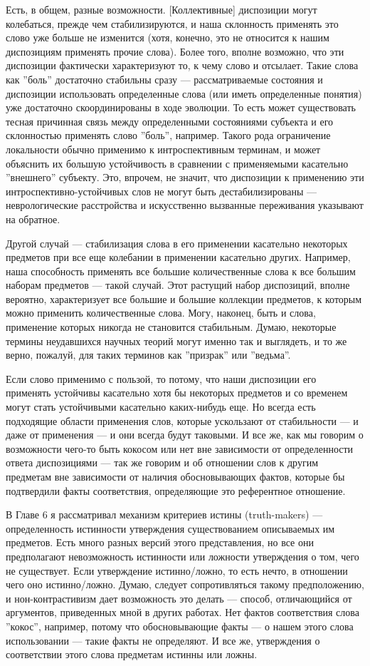 \documentclass[11pt]{book}
\begin{document}
Есть, в общем, разные возможности. [Коллективные] диспозиции могут колебаться, прежде чем стабилизируются, и наша склонность применять это слово уже больше не изменится (хотя, конечно, это не относится к нашим диспозициям применять прочие слова). Более того, вполне возможно, что эти диспозиции фактически характеризуют то, к чему слово и отсылает. Такие слова как ''боль'' достаточно стабильны сразу --- рассматриваемые состояния и диспозиции использовать определенные слова (или иметь определенные понятия) уже достаточно скоординированы в ходе эволюции. То есть может существовать тесная причинная связь между определенными состояниями субъекта и его склонностью применять слово ''боль'', например. Такого рода ограничение локальности обычно применимо к интроспективным терминам, и может объяснить их большую устойчивость в сравнении с применяемыми касательно ''внешнего'' субъекту. Это, впрочем, не значит, что диспозиции к применению эти интроспективно-устойчивых слов не могут быть дестабилизированы --- неврологические расстройства и искусственно вызванные переживания указывают на обратное.

Другой случай --- стабилизация слова в его применении касательно некоторых предметов при все еще колебании в применении касательно других. Например, наша способность применять все большие количественные слова к все большим наборам предметов --- такой случай. Этот растущий набор диспозиций, вполне вероятно, характеризует все большие и большие коллекции предметов, к которым можно применить количественные слова. Могу, наконец, быть и слова, применение которых никогда не становится стабильным. Думаю, некоторые термины неудавшихся научных теорий могут именно так и выглядеть, и то же верно, пожалуй, для таких терминов как ''призрак'' или ''ведьма''.

Если слово применимо с пользой, то потому, что наши диспозиции его применять устойчивы касательно хотя бы некоторых предметов и со временем могут стать устойчивыми касательно каких-нибудь еще. Но всегда есть подходящие области применения слов, которые ускользают от стабильности --- и даже от применения --- и они всегда будут таковыми. И все же, как мы говорим о возможности чего-то быть кокосом или нет вне зависимости от определенности ответа диспозициями --- так же говорим и об отношении слов к другим предметам вне зависимости от наличия обосновывающих фактов, которые бы подтвердили факты соответствия, определяющие это референтное отношение.

В Главе 6 я рассматривал механизм критериев истины (truth-makers) --- определенность истинности утверждения существованием описываемых им предметов. Есть много разных версий этого представления, но все они предполагают невозможность истинности или ложности утверждения о том, чего не существует. Если утверждение истинно/ложно, то есть нечто, в отношении чего оно истинно/ложно. Думаю, следует сопротивляться такому предположению, и нон-контрастивизм дает возможность это делать --- способ, отличающийся от аргументов, приведенных мной в других работах. Нет фактов соответствия слова ''кокос'', например, потому что обосновывающие факты --- о нашем этого слова использовании --- такие факты не определяют. И все же, утверждения о соответствии этого слова предметам истинны или ложны.
\end{document}
